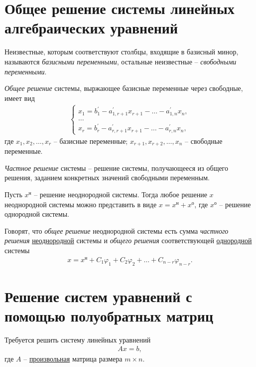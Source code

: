 \documentclass[%
	11pt,
	a4paper,
	utf8,
		]{article}
\begin{document}
\section{Общее решение системы линейных алгебраических уравнений}

Неизвестные, которым соответствуют столбцы, входящие в базисный минор, называются \emph{базисными переменными}, остальные неизвестные -- \emph{свободными переменными}.

\emph{Общее решение} системы, выржающее базисные переменные через свободные, имеет вид \cite[]{bortakovskiy:2005}
\begin{align*}
	\begin{cases}
		x_1 = b_1^{'} - a_{1, r + 1}^{'} x_{r + 1} - \ldots - a_{1, n}^{'} x_n, \\
		\ldots \\
		x_r = b_r^{'} - a_{r, r + 1}^{'} x_{r + 1} - \ldots - a_{r, n}^{'} x_n,
	\end{cases}
\end{align*}
где $ x_1, x_2, \ldots, x_r $ -- базисные переменные; $ x_{r + 1}, x_{r + 2}, \ldots, x_{n} $ -- свободные переменные.

\emph{Частное решение} системы -- решение системы, получающееся из общего решения, заданием конкретных значений свободными переменным.

Пусть $ x^{н} $ -- решение неоднородной системы. Тогда любое решение $ x $ неоднородной системы можно представить в виде $ x = x^\text{н} + x^\text{о} $, где $ x^\text{о} $ -- решение однородной системы.

Говорят, что \emph{общее решение} неоднородной системы есть сумма \emph{частного решения} \underline{неоднородной} системы и \emph{общего решения} соответствующей \underline{однородной} системы \cite[]{bortakovskiy:2005}
\begin{align*}
	x = x^\text{н} + C_1 \varphi_1 + C_2 \varphi_2 + \ldots + C_{n - r} \varphi_{n - r}.
\end{align*}


\section{Решение систем уравнений с помощью полуобратных матриц}

Требуется решить систему линейных уравнений
\begin{align*}
	A x = b,
\end{align*}
где $ A $ -- \underline{произвольная} матрица размера $ m \times n $.
\end{document}
